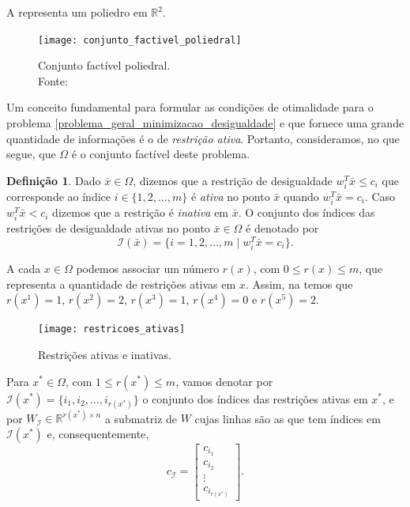 \documentclass[12pt,a4paper]{scrartcl}
\def\RR{\mathds{R}}
\def\xbar{\bar{x}}
\theoremstyle{definition}%
\newtheorem{defi}{Definição}
\begin{document}
A  representa um poliedro em $\RR^{2}$.

\begin{figure}[!ht] 
	\centering
	\texttt{[image: conjunto\_factivel\_poliedral]}
	\caption{Conjunto factível poliedral. \\ Fonte: \textcite{Ana1994} \label{fig:regiao_factivel_poliedro}}
\end{figure}

Um conceito fundamental para formular as condições de otimalidade para o problema \eqref{problema_geral_minimizacao_desigualdade} e que fornece uma grande quantidade de informações é o de \emph{restrição ativa}. Portanto, consideramos, no que segue, que $\Omega$ é o conjunto factível deste problema.

\begin{defi}
Dado $\xbar \in \Omega$, dizemos que a restrição de desigualdade $w_{i}^{T}\bar{x} \leq c_{i}$ que corresponde ao índice $i\in \{ 1,2, \ldots , m\}$ é \emph{ativa} no ponto $\xbar$ quando $w_{i}^{T}\bar{x} = c_{i}$. Caso $w_{i}^{T}\bar{x} < c_{i}$ dizemos que a restrição é \emph{inativa} em $\xbar$. O conjunto dos índices das restrições de desigualdade ativas no ponto $\xbar \in \Omega$ é denotado por
\[
\mathcal{I} (\xbar) = \{ i = 1,2, \ldots , m \mid w_{i}^{T}\bar{x} = c_{i} \} .
\]
\end{defi} 


A cada $x\in \Omega$ podemos associar um número $r(x)$, com $0\leq r(x) \leq m$, que representa a quantidade de restrições ativas em $x$. Assim, na  temos que $r(x^{1}) = 1$, $r(x^{2}) = 2$, $r(x^{3}) = 1$, $r(x^{4}) = 0$ e $r(x^{5}) = 2$.

\begin{figure}[!ht] 
	\centering
	\texttt{[image: restricoes\_ativas]}
	\caption{Restrições ativas e inativas. \label{fig:restricoes_ativas}}
\end{figure}

Para $x^{*} \in \Omega$, com $1 \leq r(x^{*}) \leq m$, vamos denotar por $\mathcal{I}(x^{*}) = \{ i_{1}, i_{2}, \ldots , i_{r(x^{*})} \}$ o conjunto dos índices das restrições ativas em $x^{*}$, e por $W_{\mathcal{I}} \in \RR^{r(x^{*})\times n}$ a submatriz de $W$ cujas linhas são as que tem índices em $\mathcal{I}(x^{*})$ e, consequentemente, 
\[
c_{\mathcal{I}} = \begin{bmatrix*} c_{i_{1}} \\ c_{i_{2}} \\ \vdots \\ c_{i_{r(x^{*})}} \end{bmatrix*} .
\]
\end{document}
